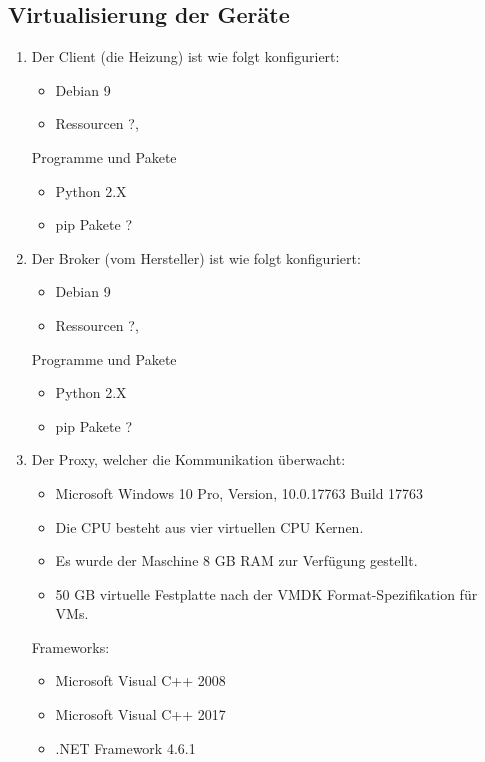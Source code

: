     \subsection{Virtualisierung der Geräte}
        \begin{enumerate}
            \item Der Client (die Heizung) ist wie folgt konfiguriert:
            \begin{itemize}
                \item Debian 9
                \item Ressourcen ?, 
            \end{itemize}
            Programme und Pakete
            \begin{itemize}
                \item Python 2.X
                \item pip Pakete ?
            \end{itemize}
            
            \item Der Broker (vom Hersteller) ist wie folgt konfiguriert:
            \begin{itemize}
                \item Debian 9
                \item Ressourcen ?, 
            \end{itemize}
            Programme und Pakete
            \begin{itemize}
                \item Python 2.X
                \item pip Pakete ?
            \end{itemize}
            
            \item Der Proxy, welcher die Kommunikation überwacht: 
            \begin{itemize}
                \item Microsoft Windows 10 Pro, Version, 10.0.17763 Build 17763
                \item Die CPU besteht aus vier virtuellen CPU Kernen.
                \item Es wurde der Maschine 8 GB \ac{RAM} zur Verfügung gestellt.
                \item 50 GB virtuelle Festplatte nach der \ac{VMDK} Format-Spezifikation für \ac{VM}s.
            \end{itemize}
            Frameworks:
            \begin{itemize}
                \item Microsoft Visual C++ 2008
                \item Microsoft Visual C++ 2017
                \item .NET Framework 4.6.1
            \end{itemize}
        \end{enumerate}
    
